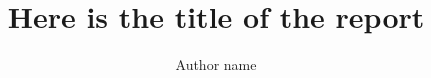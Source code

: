 \documentclass[3p,times,procedia]{elsarticle}
\begin{document}
\begin{frontmatter}



%


\title{\textbf{Here is the title of the report}}




\author{Author name} 

\address{Department of Computer Science, Babe\c s-Bolyai University\\1, M. Kogalniceanu Street, 400084, Cluj-Napoca, Romania\\E-mail: .....}

\begin{abstract}

\end{abstract}

\begin{keyword}




\end{keyword}
\end{frontmatter}
\end{document}
